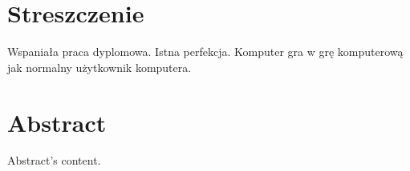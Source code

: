 \chapter*{Streszczenie}
Wspaniała praca dyplomowa. Istna perfekcja. Komputer gra w grę komputerową jak normalny użytkownik komputera.

\chapter*{Abstract}
Abstract's content.
